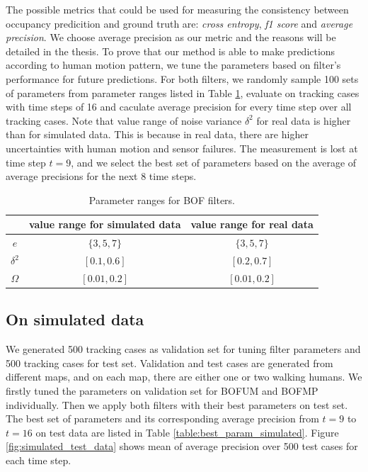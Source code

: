 The possible metrics that could be used for measuring the consistency between occupancy predicition and ground truth are: \textit{cross entropy}, \textit{f1 score} and \textit{average precision}.  We choose average precision as our metric and the reasons will be detailed in the thesis. To prove that our method is able to make predictions according to human motion pattern, we tune the parameters based on filter's performance for future predictions. For both filters, we randomly sample 100 sets of parameters from parameter ranges listed in Table \ref{table:param_range}, evaluate on tracking cases with time steps of 16 and caculate average precision for every time step over all tracking cases. Note that value range of noise variance $\delta^2$ for real data is higher than for simulated data. This is because in real data, there are higher uncertainties with human motion and sensor failures. The measurement is lost at time step \( t=9\), and we select the best set of parameters based on the average of average precisions for the next \( 8 \) time steps. 

\begin{table}[H]
\centering
  \begin{tabular}{c|c|c}
    \hline
     &   value range for simulated data & value range for real data \\ \hline
    \( e \) & \( \{3, 5, 7\} \) &  \( \{3, 5, 7\} \)\\
    \(  \delta^2\) & \( [0.1, 0.6]\) & \( [0.2, 0.7]\) \\   
   \( \Omega \) & \( [0.01, 0.2] \) & \( [0.01, 0.2] \)\\
   \hline
 \end{tabular}
\label{table:param_range}
\caption{Parameter ranges for BOF filters.}
\end{table}

\subsection{On simulated data}

We generated 500 tracking cases as validation set for tuning filter parameters and 500 tracking cases for test set. Validation and test cases are generated from different maps, and on each map, there are either one or two walking humans. We firstly tuned the parameters on validation set for BOFUM and BOFMP individually. Then we apply both filters with their best parameters on test set. The best set of parameters and its corresponding average precision from \( t=9 \) to \( t=16 \) on test data are listed in Table \ref{table:best_param_simulated}. Figure \ref{fig:simulated_test_data} shows mean of average precision over 500 test cases for each time step.

